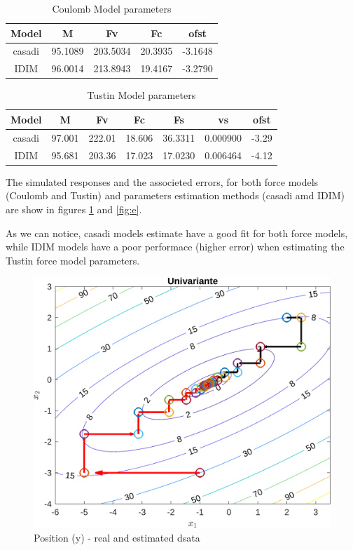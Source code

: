 \documentclass[10pt, a4paper]{article}
\begin{document}
\begin{table}[H]
      \small
      \centering
      \caption{Coulomb Model parameters}
      \begin{tabular}{c|c|c|c|c}
            Model &  M & Fv & Fc & ofst \\
            \hline
            casadi & 95.1089 & 203.5034 & 20.3935 & -3.1648 \\
            IDIM   & 96.0014 & 213.8943 & 19.4167 & -3.2790 \\
      \end{tabular}
      \label{table:m1}
\end{table}

\begin{table}[H]
      \small
      \centering
      \caption{Tustin Model parameters}
      \begin{tabular}{c|c|c|c|c|c|c}
            Model &  M & Fv & Fc & Fs & vs & ofst \\
            \hline
            casadi & 97.001 & 222.01 & 18.606 & 36.3311 & 0.000900 & -3.29 \\
            IDIM   & 95.681 & 203.36 & 17.023 & 17.0230 & 0.006464 & -4.12 \\
      \end{tabular}
      \label{table:m2}
\end{table}

The simulated responses and the associeted errors, for both force models (Coulomb and Tustin) and parameters estimation methods (casadi amd IDIM) are show in figures \ref{fig:y} and \ref{fig:e}.

As we can notice, casadi models estimate have a good fit for both force models, while IDIM models have a poor performace (higher error) when estimating the Tustin force model parameters.

\begin{figure}[H]
      \centering
      \includegraphics[width=\textwidth]{img01A_m01.png}
      \caption{Position (y) - real and estimated dsata}
      \label{fig:y}
\end{figure}
\end{document}
